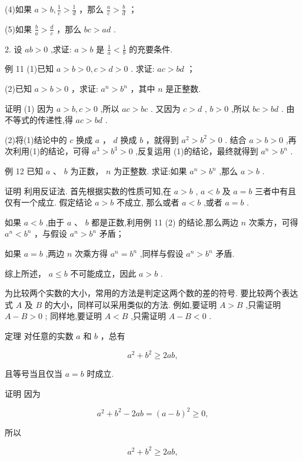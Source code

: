 \documentclass[10pt]{article}
\begin{document}
(4)如果 \(a > b,\frac{1}{c} > \frac{1}{d}\) ，那么 \(\frac{a}{c} > \frac{b}{d}\) ；

(5)如果 \(\frac{b}{a} > \frac{d}{c}\) ，那么 \({bc} > {ad}\) .

2. 设 \({ab} > 0\) ,求证: \(a > b\) 是 \(\frac{1}{a} < \frac{1}{b}\) 的充要条件.



例 11 (1)已知 \(a > b > 0,c > d > 0\) . 求证: \({ac} > {bd}\) ；

(2)已知 \(a > b > 0\) ，求证: \({a}^{n} > {b}^{n}\) ，其中 \(n\) 是正整数.

证明 (1) 因为 \(a > b,c > 0\) ,所以 \({ac} > {bc}\) . 又因为 \(c > d\) , \(b > 0\) ,所以 \({bc} > {bd}\) . 由不等式的传递性,得 \({ac} > {bd}\) .

(2)将(1)结论中的 \(c\) 换成 \(a\) ， \(d\) 换成 \(b\) ，就得到 \({a}^{2} > {b}^{2} > 0\) . 结合 \(a > b > 0\) ,再次利用(1)的结论，可得 \({a}^{3} > {b}^{3} > 0\) ,反复运用 (1)的结论，最终就得到 \({a}^{n} > {b}^{n}\) .

例 12 已知 \(a\text{ 、 }b\) 为正数， \(n\) 为正整数. 求证:如果 \({a}^{n} > {b}^{n}\) ,那么 \(a > b\) .

证明 利用反证法. 首先根据实数的性质可知,在 \(a > b\) , \(a < b\) 及 \(a = b\) 三者中有且仅有一个成立. 假定结论 \(a > b\) 不成立, 那么或者 \(a < b\) ,或者 \(a = b\) .

如果 \(a < b\) ,由于 \(a\text{ 、 }b\) 都是正数,利用例 11 (2) 的结论,那么两边 \(n\) 次乘方，可得 \({a}^{n} < {b}^{n}\) ，与假设 \({a}^{n} > {b}^{n}\) 矛盾；

如果 \(a = b\) ,两边 \(n\) 次乘方得 \({a}^{n} = {b}^{n}\) ,同样与假设 \({a}^{n} > {b}^{n}\) 矛盾.

综上所述， \(a \leq  b\) 不可能成立，因此 \(a > b\) .

为比较两个实数的大小，常用的方法是判定这两个数的差的符号. 要比较两个表达式 \(A\) 及 \(B\) 的大小，同样可以采用类似的方法. 例如,要证明 \(A > B\) ,只需证明 \(A - B > 0\) ; 同样地,要证明 \(A < B\) ,只需证明 \(A - B < 0\) .

定理 对任意的实数 \(a\) 和 \(b\) ，总有

\[
{a}^{2} + {b}^{2} \geq  {2ab},
\]

且等号当且仅当 \(a = b\) 时成立.

证明 因为

\[
{a}^{2} + {b}^{2} - {2ab} = {\left( a - b\right) }^{2} \geq  0,
\]

所以

\[
{a}^{2} + {b}^{2} \geq  {2ab},
\]
\end{document}
